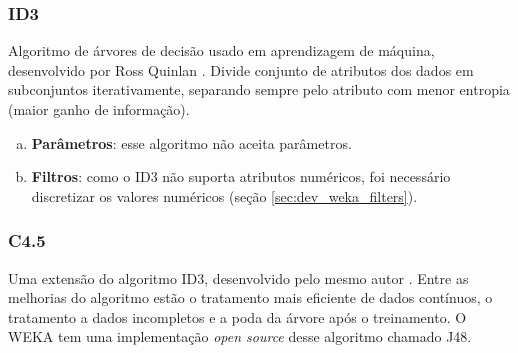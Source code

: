 \subsubsection{ID3}

Algoritmo de árvores de decisão usado em aprendizagem de máquina, desenvolvido por Ross Quinlan \cite{Quinlan1986}. Divide conjunto de atributos dos dados em subconjuntos iterativamente, separando sempre pelo atributo com menor entropia (maior ganho de informação).

\begin{enumerate}[a)]
    \item \textbf{Parâmetros}: esse algoritmo não aceita parâmetros.
    \item \textbf{Filtros}: como o ID3 não suporta atributos numéricos, foi necessário discretizar os valores numéricos (seção \ref{sec:dev_weka_filters}).
\end{enumerate}

\subsubsection{C4.5}

Uma extensão do algoritmo ID3, desenvolvido pelo mesmo autor \cite{Quinlan1993}. Entre as melhorias do algoritmo estão o tratamento mais eficiente de dados contínuos, o tratamento a dados incompletos e a poda da árvore após o treinamento. O WEKA tem uma implementação \emph{open source} desse algoritmo chamado J48.

